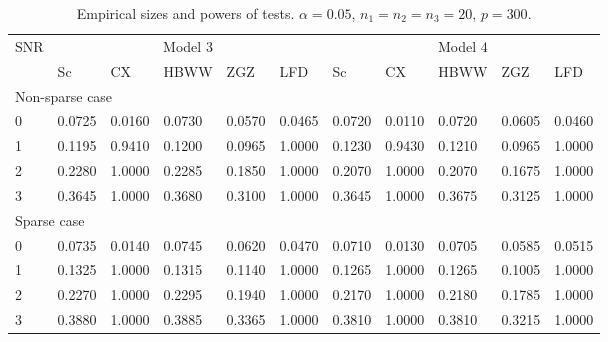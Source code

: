 \documentclass[12pt]{article} %
\theoremstyle{definition}
\begin{document}
\begin{table}[!hbp]
    \caption{Empirical sizes and powers of tests. $\alpha=0.05$, $n_1=n_2=n_3=20$, $p=300$. }
    \label{table2}
    \centering
    \begin{tabular}{*{11}{l}}
    \toprule
    \multirow{2}{*}{SNR} &\multicolumn{5}{c}{Model $3$}&
    \multicolumn{5}{c}{Model $4$} \\
        \cmidrule(r){2-6}\cmidrule(r){7-11}
& Sc & CX & HBWW & ZGZ & LFD & Sc & CX & HBWW & ZGZ & LFD \\ 
    \midrule
    \multicolumn{5}{l}{Non-sparse case}
    \\
    \midrule
  0 & 0.0725 & 0.0160 & 0.0730 & 0.0570 & 0.0465 & 0.0720 & 0.0110 & 0.0720 & 0.0605 & 0.0460 \\ 
      1 & 0.1195 & 0.9410 & 0.1200 & 0.0965 & 1.0000 & 0.1230 & 0.9430 & 0.1210 & 0.0965 & 1.0000 \\ 
      2 & 0.2280 & 1.0000 & 0.2285 & 0.1850 & 1.0000 & 0.2070 & 1.0000 & 0.2070 & 0.1675 & 1.0000 \\ 
      3 & 0.3645 & 1.0000 & 0.3680 & 0.3100 & 1.0000 & 0.3645 & 1.0000 & 0.3675 & 0.3125 & 1.0000 \\ 
    \midrule
    \multicolumn{5}{l}{Sparse case}
    \\
    \midrule
      0 & 0.0735 & 0.0140 & 0.0745 & 0.0620 & 0.0470 & 0.0710 & 0.0130 & 0.0705 & 0.0585 & 0.0515 \\ 
      1 & 0.1325 & 1.0000 & 0.1315 & 0.1140 & 1.0000 & 0.1265 & 1.0000 & 0.1265 & 0.1005 & 1.0000 \\ 
      2 & 0.2270 & 1.0000 & 0.2295 & 0.1940 & 1.0000 & 0.2170 & 1.0000 & 0.2180 & 0.1785 & 1.0000 \\ 
      3 & 0.3880 & 1.0000 & 0.3885 & 0.3365 & 1.0000 & 0.3810 & 1.0000 & 0.3810 & 0.3215 & 1.0000 \\    
\bottomrule
\end{tabular}
\end{table}
\end{document}
